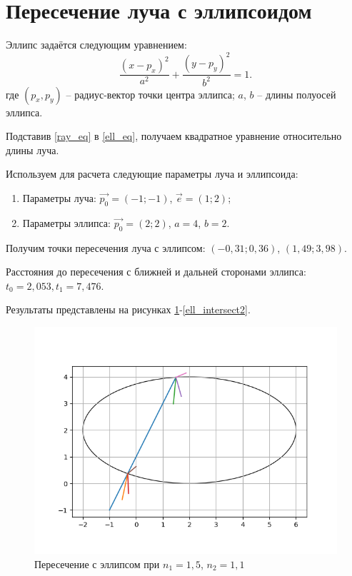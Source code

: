 \section{Пересечение луча с эллипсоидом}{
	Эллипс задаётся следующим уравнением:
	\begin{equation}\label{ell_eq}
		\frac{(x - p_x)^2}{a^2} + \frac{(y - p_y)^2}{b^2} = 1.
	\end{equation}
	где $(p_x, p_y)$ -- радиус-вектор точки центра эллипса;
	 \newline $a$, $b$ -- длины полуосей эллипса.
	
	Подставив \eqref{ray_eq} в \eqref{ell_eq}, получаем квадратное уравнение относительно длины луча. 
	
	Используем для расчета следующие параметры луча и эллипсоида:
	\begin{enumerate}
	\item Параметры луча: $\vec{p_0} = (-1; -1)$, $\vec{e} = (1; 2)$;
	\item Параметры эллипса: $\vec{p_0} = (2; 2)$, $a = 4$, $b = 2$.
	\end{enumerate}
	
	Получим точки пересечения луча с эллипсом: $(-0,31; 0,36)$, $(1,49; 3,98)$.
	
	Расстояния до пересечения с ближней и дальней сторонами эллипса: ${t_0 = 2,053, t_1 = 7,476}$.
		
	Результаты представлены на рисунках \ref{ell_intersect1}-\ref{ell_intersect2}.
	
	\begin{figure}[H]
		\includegraphics[width=0.7\pagewidth]{ell_intersect1}
		\caption{Пересечение с эллипсом при $n_1 = 1,5$, $n_2 = 1,1$}
		\label{ell_intersect1}
	\end{figure}
	
}
